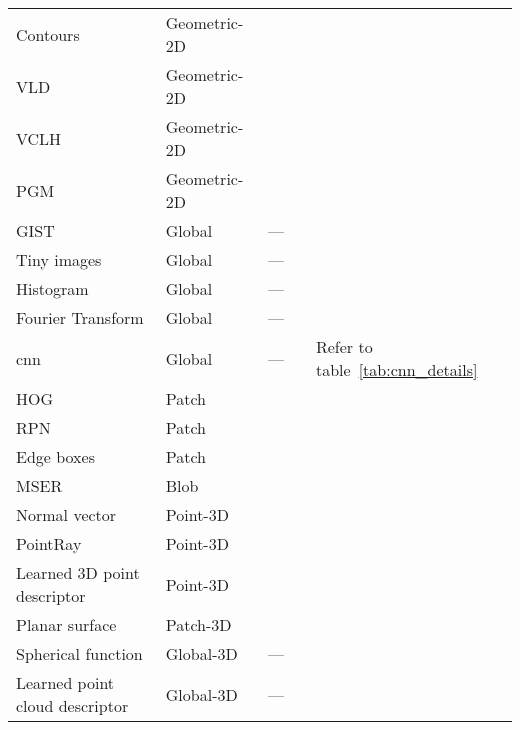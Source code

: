 \begin{landscape}
\begin{table}[t]
{\begin{tabular}{l l c c l}
			Contours \citep{canny1986computational}				& Geometric-2D		& \cmark	& \xmark		& \citep{Ramalingam2010,Russell2011} \\
			VLD \citep{Liu2012}			& Geometric-2D		& \xmark	& \cmark		& \citep{Majdik2013} \\
			VCLH \citep{Cham2010}		& Geometric-2D	& \cmark	& \cmark		& \citep{Cham2010} \\			
            PGM \citep{Li2015}			& Geometric-2D		& \xmark	& \cmark		& \citep{Li2015} \\
			\hline
			GIST \citep{Oliva2001} 			& Global 		& ---		& \cmark		& \citep{Hays2008,Russell2011,Murillo2013,Azzi2016} \\
			Tiny images			& Global		& ---		& \cmark		& \citep{Hays2008,Gee2012,Corke2013} \\
			Histogram			& Global		& ---		& \cmark		& \citep{Hays2008,Ni2009} \\
			Fourier Transform	& Global		& ---		& \cmark		& \citep{Wan2016} \\
			\Ac*{cnn} 			& Global		& ---		& \cmark		& Refer to table~\ref{tab:cnn_details} \\
			\hline
			HOG \citep{Dalal2005}			& Patch			& \xmark	& \cmark		& \citep{Shrivastava2011,Aubry2014,McManus2014,Morago2016} \\
			RPN \citep{Ren2015} 			& Patch 		& \cmark	& \xmark		& \citep{Gordo2016} \\
			Edge boxes \citep{Zitnick2014}		& Patch			& \cmark	& \xmark		& \citep{Sunderhauf2015a,Panphattarasap2016,Yan2016} \\
			MSER \citep{Matas2004}			& Blob			& \cmark	& \xmark		& \citep{Kim2015,Nister2006} \\
			\hline
			Normal vector		& Point-3D			& \cmark	& \xmark		& \citep{Li2016,Fernandez-Moral2013} \\
			PointRay \citep{Bansal2014}		& Point-3D		& \cmark	& \cmark		& \citep{Bansal2014} \\			
			Learned 3D point descriptor			& Point-3D			& \xmark	& \cmark		& \citep{Zeng2016,Deng2018,Yew2018}\\
			Planar surface & Patch-3D			& \cmark	& \xmark		& \citep{Fernandez-Moral2013} \\			
			Spherical function \citep{Saupe2001}			& Global-3D			& ---	& \cmark		& \citep{Lu2015}\\
			Learned point cloud descriptor		& Global-3D			& ---	& \cmark		& \citep{Uy2018,Schonberger2017a}\\
			\hline
		\end{tabular}
	}
\end{table}
\end{landscape}